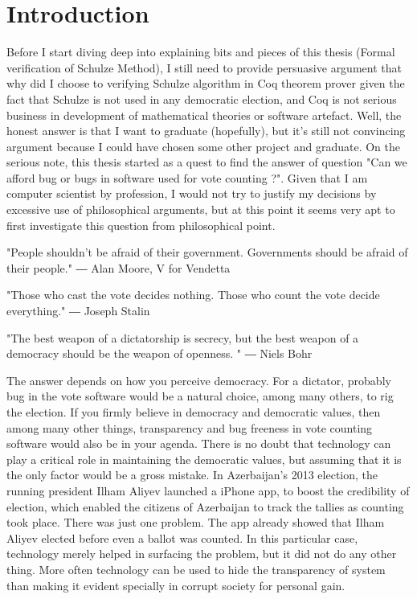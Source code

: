 \chapter{Introduction}
\label{cha:intro}
Before I start diving deep into explaining bits and pieces of this thesis (Formal verification of Schulze Method), 
I still need to provide persuasive  argument that why did I choose to verifying Schulze algorithm in Coq theorem 
prover given the fact that Schulze is not used in any democratic election, and Coq is not serious business in 
development of mathematical theories or software artefact.   Well, the honest answer 
is that  I want to graduate (hopefully), but it's still not convincing argument because I could have chosen 
some other project and graduate.  On the serious note, this thesis started as a quest to 
find the answer of question  "Can we afford bug or bugs in software used for vote counting ?".  Given that I am 
computer scientist by profession, I would not try to justify my decisions by excessive use of philosophical 
arguments, but at this point it seems very apt to first investigate this question from philosophical point. 

"People shouldn't be afraid of their government. Governments should be afraid of their people."
― Alan Moore, V for Vendetta 


"Those who cast the vote decides nothing. Those who count the vote decide everything."
―  Joseph Stalin


"The best weapon of a dictatorship is secrecy, but the best weapon of a democracy should be the 
weapon of openness. " 
―   Niels Bohr

The answer depends on how you perceive democracy.  For a dictator, probably  bug in the 
vote software would be a natural choice, among many others,  to rig the election. If you firmly believe 
in democracy and democratic values, then 
among many other things, transparency and bug freeness in vote counting software  would also be 
in your agenda. There is no doubt that technology can play a critical role in maintaining the democratic values, 
but assuming that it is the only factor would be a gross mistake. 
In Azerbaijan's 2013 election, the running president Ilham Aliyev launched a iPhone app, to boost the 
credibility of election, which enabled the citizens of Azerbaijan to 
track the tallies as counting took place. There was just one problem. The app already showed that 
Ilham Aliyev elected before even a ballot was counted.  In this particular case, technology merely helped in 
surfacing the problem, but it did not do any other thing.  More often technology can be used to hide 
the transparency of system than making it evident specially in corrupt society for personal gain. 


